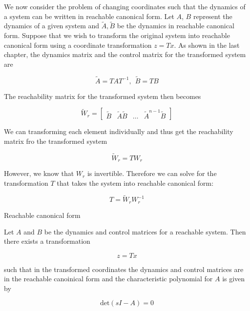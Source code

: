 We now consider the problem of changing coordinates such that the dynamics
of a system can be written in reachable canonical form. Let $A$, $B$ represent the
dynamics of a given system and $\tilde{A}, \tilde{B}$ be the dynamics in reachable canonical form.
Suppose that we wish to transform the original system into reachable canonical
form using a coordinate transformation $z = Tx$. As shown in the last chapter, the
dynamics matrix and the control matrix for the transformed system are


\begin{equation}
\tilde{A} = TAT^{-1}, ~~ \tilde{B} = TB
\end{equation}

The reachability matrix for the transformed system then becomes

\begin{equation}
\tilde{W}_r = \begin{bmatrix}
 \tilde{B} & \tilde{A}\tilde{B} & \ldots & \tilde{A}^{n-1}\tilde{B} 
\end{bmatrix}
\end{equation}

We can transforming each element individually and thus get the reachability matrix fro the transformed system

\begin{equation}
\tilde{W}_r = TW_r
\end{equation}

However, we know that $W_r$ is invertible. Therefore we can solve for the transformation $T$ that takes the system into reachable canonical form:

\begin{equation}
T = \tilde{W}_r W_{r}^{-1}
\end{equation}


\begin{framed}
\theoremstyle{theorem}
\begin{theorem}{Reachable canonical form}

Let $A$ and $B$ be the dynamics and control matrices for a reachable system. Then there exists a transformation

\begin{equation}
z = Tx \nonumber
\end{equation}

such that in the transformed coordinates  the dynamics and control matrices are in the reachable 
canoinical form and the characteristic polynomial for $A$ is given by

\begin{equation}
\text{det}(sI-A) = 0 \nonumber
\end{equation}

\end{theorem}
\end{framed}

